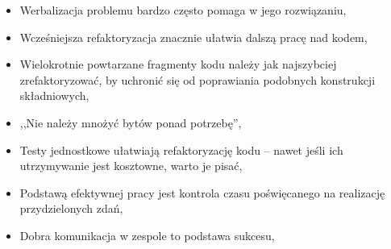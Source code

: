 \begin{description}
\begin{itemize}
\item Werbalizacja problemu bardzo często pomaga w jego rozwiązaniu,
\item Wcześniejsza refaktoryzacja znacznie ułatwia dalszą pracę nad kodem,
\item Wielokrotnie powtarzane fragmenty kodu należy jak najszybciej zrefaktoryzować, by uchronić się od poprawiania podobnych konstrukcji składniowych,
\item ,,Nie należy mnożyć bytów ponad potrzebę'',
\item Testy jednostkowe ułatwiają refaktoryzację kodu -- nawet jeśli ich utrzymywanie jest kosztowne, warto je pisać,
\item Podstawą efektywnej pracy jest kontrola czasu poświęcanego na realizację przydzielonych zdań,
\item Dobra komunikacja w zespole to podstawa sukcesu,
\end{itemize}
\end{description}
